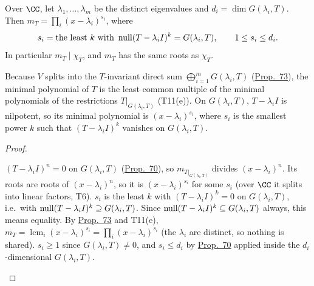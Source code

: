 \documentclass[10pt]{scrartcl}
\begin{document}
\begin{proposition*}\hypertarget{name-exponents-of-m-t-over-cc-m6}{}\label{name-exponents-of-m-t-over-cc-m6}
  Over $\CC$, let $\lambda_1,\dots,\lambda_m$ be the distinct eigenvalues and $d_i=\dim G(\lambda_i,T)$. Then $m_T=\prod_i(x-\lambda_i)^{s_i}$, where
  \[ s_i=\text{the least }k\text{ with }\operatorname{null}(T-\lambda_iI)^k=G(\lambda_i,T),\qquad 1\le s_i\le d_i. \]
  In particular $m_T\mid\chi_T$, and $m_T$ has the same roots as $\chi_T$.
\end{proposition*}
\begin{ideabox}
Because $V$ splits into the $T$-invariant direct sum $\bigoplus_{i=1}^m G(\lambda_i,T)$ (\hyperref[prop-73]{Prop.~73}), the minimal polynomial of $T$ is the least common multiple of the minimal polynomials of the restrictions $T|_{G(\lambda_i,T)}$ (T11(e)). On $G(\lambda_i,T)$, $T-\lambda_iI$ is nilpotent, so its minimal polynomial is $(x-\lambda_i)^{s_i}$, where $s_i$ is the smallest power $k$ such that $(T-\lambda_iI)^k$ vanishes on $G(\lambda_i,T)$.
\end{ideabox}
\begin{proof}
  \begin{steps}
    \ii $(T-\lambda_iI)^n=0$ on $G(\lambda_i,T)$ (\hyperref[prop-70]{Prop.~70}), so $m_{T|_{G(\lambda_i,T)}}$ divides $(x-\lambda_i)^n$. Its roots are roots of $(x-\lambda_i)^n$, so it is $(x-\lambda_i)^{s_i}$ for some $s_i$ (over $\CC$ it splits into linear factors, T6).
    \ii $s_i$ is the least $k$ with $(T-\lambda_iI)^k=0$ on $G(\lambda_i,T)$, i.e.\ with $\operatorname{null}(T-\lambda_iI)^k\supseteq G(\lambda_i,T)$. Since $\operatorname{null}(T-\lambda_iI)^k\subseteq G(\lambda_i,T)$ always, this means equality.
    \ii By \hyperref[prop-73]{Prop.~73} and T11(e), $m_T=\operatorname{lcm}_i(x-\lambda_i)^{s_i}=\prod_i(x-\lambda_i)^{s_i}$ (the $\lambda_i$ are distinct, so nothing is shared).
    \ii $s_i\ge1$ since $G(\lambda_i,T)\ne0$, and $s_i\le d_i$ by \hyperref[prop-70]{Prop.~70} applied inside the $d_i$-dimensional $G(\lambda_i,T)$.
  \end{steps}
\end{proof}
\end{document}
